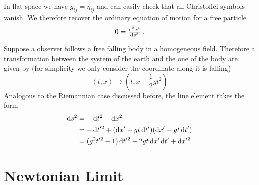 In flat space we have $g_{ij}=\eta_{ij}$ and can easily check that all
Christoffel symbols vanish. We therefore recover the ordinary equation of motion for a free particle
\begin{equation}
    0 = \od[2]{x^i}{s}\, .
\end{equation}
\begin{example}
Suppose a observer follows a free falling body in a homogeneous field.
Therefore a transformation between the system of the earth and the one of the body are given by
(for simplicity we only consider the coordinate along it is falling)
\begin{equation}
    (t,x)\to\left(t,x-\frac{1}{2}gt^2\right)
\end{equation}
Analogous to the Riemannian case discussed before, the line element takes the form
\begin{equation}
    \begin{split}
\dif s^2&=-\dif t^2 +\dif x^2\\
&=-\dif t'^2+(\dif x'- gt\dif t')(\dif x'- gt\dif t')\\
&=(g^2t'^2-1)\dif t'^2-2gt\dif x'\dif t'+\dif x'^2
\end{split}
\end{equation}
\end{example}
\section{Newtonian Limit}